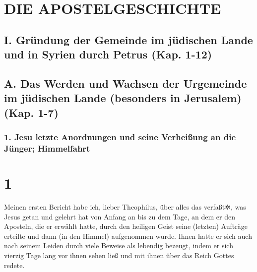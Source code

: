 \hypertarget{die-apostelgeschichte}{%
\section{DIE APOSTELGESCHICHTE}\label{die-apostelgeschichte}}

\hypertarget{i.-gruxfcndung-der-gemeinde-im-juxfcdischen-lande-und-in-syrien-durch-petrus-kap.-1-12}{%
\subsection{I. Gründung der Gemeinde im jüdischen Lande und in Syrien
durch Petrus (Kap.
1-12)}\label{i.-gruxfcndung-der-gemeinde-im-juxfcdischen-lande-und-in-syrien-durch-petrus-kap.-1-12}}

\hypertarget{a.-das-werden-und-wachsen-der-urgemeinde-im-juxfcdischen-lande-besonders-in-jerusalem-kap.-1-7}{%
\subsection{A. Das Werden und Wachsen der Urgemeinde im jüdischen Lande
(besonders in Jerusalem) (Kap.
1-7)}\label{a.-das-werden-und-wachsen-der-urgemeinde-im-juxfcdischen-lande-besonders-in-jerusalem-kap.-1-7}}

\hypertarget{jesu-letzte-anordnungen-und-seine-verheiuxdfung-an-die-juxfcnger-himmelfahrt}{%
\subsubsection{1. Jesu letzte Anordnungen und seine Verheißung an die
Jünger;
Himmelfahrt}\label{jesu-letzte-anordnungen-und-seine-verheiuxdfung-an-die-juxfcnger-himmelfahrt}}

\hypertarget{section}{%
\section{1}\label{section}}

 Meinen ersten Bericht habe ich, lieber Theophilus, über
alles das verfaßt✲, was Jesus getan und gelehrt hat von Anfang an
 bis zu dem Tage, an dem er den Aposteln, die er erwählt
hatte, durch den heiligen Geist seine (letzten) Aufträge erteilte und
dann (in den Himmel) aufgenommen wurde.  Ihnen hatte er
sich auch nach seinem Leiden durch viele Beweise als lebendig bezeugt,
indem er sich vierzig Tage lang vor ihnen sehen ließ und mit ihnen über
das Reich Gottes redete.


